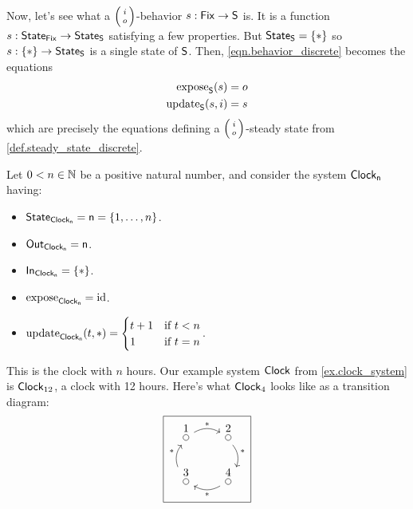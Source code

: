 \documentclass[DynamicalBook]{subfiles}
\begin{document}
\begin{example}
  Now, let's see what a $\lens{i}{o}$-behavior $s : \mathsf{Fix} \to \mathsf{S}$ is. It is
  a function $s : \mathsf{State}_{\mathsf{Fix}} \to \mathsf{State}_{\mathsf{S}}$ satisfying a few properties. But
  $\mathsf{State}_{\mathsf{S}} = \{\ast\}$ so $s : \{\ast\} \to \mathsf{State}_{\mathsf{S}}$ is a single state of
  $\mathsf{S}$. Then, \cref{eqn.behavior_discrete} becomes the equations
  \begin{align*}
    \mathrm{expose}_{\mathsf{S}}(s) &= o\\
    \mathrm{update}_{\mathsf{S}}(s, i) &= s
  \end{align*}
  which are precisely the equations defining a $\lens{i}{o}$-steady state from \cref{def.steady_state_discrete}.
  
\end{example}

\begin{example}\label{ex.periodic_orbit_as_behavior}
  Let $0 < n \in \mathbb{N}$ be a positive natural number, and consider the system $\mathsf{Clock_n}$
  having:
  \begin{itemize}
    \item $\mathsf{State}_{\mathsf{Clock_n}} = \mathsf{n} = \{1,\ldots, n\}$.
    \item $\mathsf{Out}_{\mathsf{Clock_n}} = \mathsf{n}$.
    \item $\mathsf{In}_{\mathsf{Clock_n}} = \{\ast\}$.
    \item $\mathrm{expose}_{\mathsf{Clock_n}} = \mathrm{id}$.
    \item $\mathrm{update}_{\mathsf{Clock_n}}(t, \ast) = \begin{cases} t + 1 &\mbox{if $t < n$}
        \\ 1 &\mbox{if $t = n$}  \end{cases}$.
  \end{itemize}

This is the clock with $n$ hours. Our example system $\mathsf{Clock}$ from
\cref{ex.clock_system} is $\mathsf{Clock}_{12}$, a clock with 12 hours. Here's what
$\mathsf{Clock}_4$ looks like as a transition diagram:
\[
\begin{tikzpicture}
	\node[draw] {
  \begin{tikzcd}[sep=small]
    \LMO{1} \ar[rr, bend left, "\ast"] & & \LMO{2} \ar[dd, bend left, "\ast"] \\
    & & \\
\LMO{3} \ar[rr, leftarrow, bend right, "\ast"'] \ar[uu, bend left, "\ast"] & & \LMO{4}
  \end{tikzcd}
  };
\end{tikzpicture}
\]


\end{example}
\end{document}
